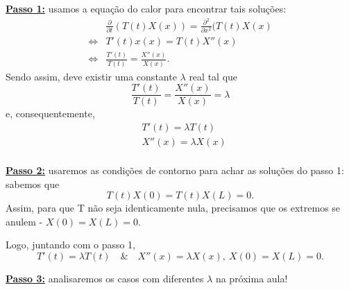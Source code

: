 \documentclass[../pde_notes.tex]{subfiles}
\begin{document}
\textbf{\underline{Passo 1:}} usamos a equação do calor para encontrar tais soluções:
\begin{align*}
	                    & \frac{\partial^{}}{\partial t^{}}(T(t)X(x)) = \frac{\partial^{2}}{\partial x^{2}}(T(t)X(x) \\
	\Longleftrightarrow & T'(t)x(x) = T(t)X''(x)                                                                     \\
	\Longleftrightarrow & \frac{T'(t)}{T(t)}= \frac{X''(x)}{X(x)}.
\end{align*}
Sendo assim, deve existir uma constante \(\lambda \) real tal que
\[
	\frac{T'(t)}{T(t)}= \frac{X''(x)}{X(x)} = \lambda
\]
e, consequentemente,
\begin{align*}
	 & T'(t)=\lambda T(t)  \\
	 & X''(x)=\lambda X(x) \\
\end{align*}

\textbf{\underline{Passo 2:}} usaremos as condições de contorno para achar as soluções do passo 1: sabemos que
\[
	T(t)X(0)=T(t)X(L)=0.
\]
Assim, para que T não seja identicamente nula, precisamos que os extremos se anulem - \(X(0)=X(L)=0.\)

Logo, juntando com o passo 1,
\[
	T'(t)=\lambda T(t) \quad\&\quad X''(x)=\lambda X(x),\: X(0)=X(L)=0.
\]

\textbf{\underline{Passo 3:}} analisaremos os casos com diferentes \(\lambda \) na \hypertarget{next_class_5}{próxima aula!}
\end{document}
